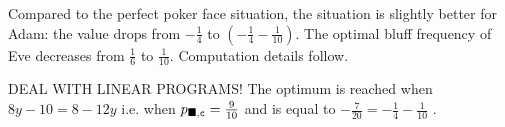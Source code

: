 Compared to the perfect poker face situation,
 the situation is slightly better for Adam:
 the value drops from $-\frac{1}{4}$
to $(-\frac{1}{4} -\frac{1}{10})$.
The optimal bluff frequency of Eve decreases
 from $\frac{1}{6}$ to $\frac{1}{10}$.
Computation details follow.

DEAL WITH LINEAR PROGRAMS!
The optimum is reached when $8y-10=8-12y$
i.e. when $p_{\blacksquare,{\tt c} }=\frac{9}{10}$
and is equal to $-\frac{7}{20}=-\frac{1}{4}-\frac{1}{10}$ .
